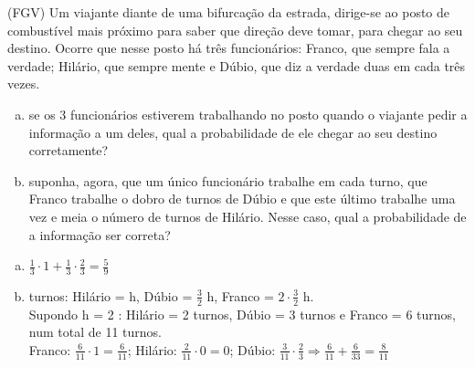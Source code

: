 \begin{ex}
 	(FGV) Um viajante diante de uma bifurcação da estrada, dirige-se ao posto de combustível mais próximo para saber que direção deve tomar, para chegar ao seu destino. Ocorre que nesse posto há três funcionários: Franco, que sempre fala a verdade; Hilário, que sempre mente e Dúbio, que diz a verdade duas em cada três vezes.
    \begin{enumerate}[(a)]
    \item se os 3 funcionários estiverem trabalhando no posto quando o viajante pedir a informação a um deles, qual a probabilidade de ele chegar ao seu destino corretamente?
    \item suponha, agora, que um único funcionário trabalhe em cada turno, que Franco trabalhe o dobro de turnos de Dúbio e que este último trabalhe uma vez e meia o número de turnos de Hilário. Nesse caso, qual a probabilidade de a informação ser correta?
    \end{enumerate}
       \begin{sol}
         \phantom{A} 
          \begin{enumerate} [(a)]
              \item $\frac{1}{3}\cdot1+\frac{1}{3}\cdot\frac{2}{3}=\frac{5}{9}$
              \item turnos: Hilário = h,  Dúbio = $\frac{3}{2} $ h,  Franco = $2\cdot\frac{3}{2}$ h. \\ Supondo h = 2 : Hilário = 2 turnos, Dúbio = 3 turnos e Franco = 6 turnos, num total de 11 turnos.\\
              Franco: $\frac{6}{11}\cdot1=\frac{6}{11}$;\hspace{0,3cm} Hilário: $\frac{2}{11}\cdot0=0 $;\hspace{0,3cm} Dúbio: $\frac{3}{11}\cdot\frac{2}{3}\Longrightarrow \frac{6}{11}+\frac{6}{33}=\frac{8}{11}$
          \end{enumerate}
       \end{sol}
\end{ex}